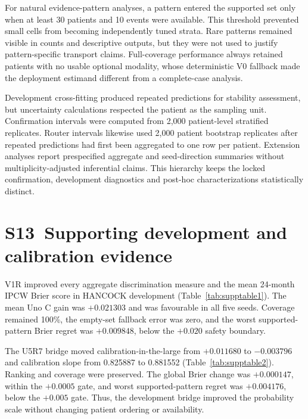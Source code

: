 For natural evidence-pattern analyses, a pattern entered the supported set only when at least 30 patients and 10 events were available. This threshold prevented small cells from becoming independently tuned strata. Rare patterns remained visible in counts and descriptive outputs, but they were not used to justify pattern-specific transport claims. Full-coverage performance always retained patients with no usable optional modality, whose deterministic V0 fallback made the deployment estimand different from a complete-case analysis.

Development cross-fitting produced repeated predictions for stability assessment, but uncertainty calculations respected the patient as the sampling unit. Confirmation intervals were computed from 2,000 patient-level stratified replicates. Router intervals likewise used 2,000 patient bootstrap replicates after repeated predictions had first been aggregated to one row per patient. Extension analyses report prespecified aggregate and seed-direction summaries without multiplicity-adjusted inferential claims. This hierarchy keeps the locked confirmation, development diagnostics and post-hoc characterizations statistically distinct.

\section*{S13~Supporting development and calibration evidence}
V1R improved every aggregate discrimination measure and the mean 24-month IPCW Brier score in HANCOCK development (Table~\ref{tab:supptable1}). The mean Uno C gain was $+0.021303$ and was favourable in all five seeds. Coverage remained 100\%, the empty-set fallback error was zero, and the worst supported-pattern Brier regret was $+0.009848$, below the $+0.020$ safety boundary.

The U5R7 bridge moved calibration-in-the-large from $+0.011680$ to $-0.003796$ and calibration slope from 0.825887 to 0.881552 (Table~\ref{tab:supptable2}). Ranking and coverage were preserved. The global Brier change was $+0.000147$, within the $+0.0005$ gate, and worst supported-pattern regret was $+0.004176$, below the $+0.005$ gate. Thus, the development bridge improved the probability scale without changing patient ordering or availability.

